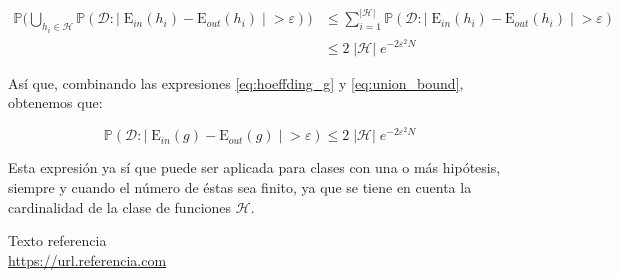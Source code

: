 \documentclass[11pt,a4paper]{article}
\begin{document}
\begin{equation}
\label{eq:union_bound}
\begin{split}
	\mathbb{P} \Bigg( \bigcup_{h_i \in \mathcal{H}}
	\mathbb{P}(\mathcal{D}: | \; \text{E}_{in}(h_i) - \text{E}_{out}(h_i) \; | \; > \varepsilon) \Bigg) &\leq
	\sum_{i = 1}^{|\mathcal{H}|} \mathbb{P}(\mathcal{D}: | \;\text{E}_{in}(h_i) - \text{E}_{out}(h_i) \; | \; > \varepsilon) \\
	&\leq 2 \; |\mathcal{H}|  \; e^{-2\varepsilon^2N}
\end{split}
\end{equation}

Así que, combinando las expresiones \eqref{eq:hoeffding_g} y \eqref{eq:union_bound}, obtenemos que:

\begin{equation}
	\mathbb{P}(\mathcal{D}: | \; \text{E}_{in}(g) - \text{E}_{out}(g) \; | \; > \varepsilon)  \leq
	2 \; |\mathcal{H}|  \; e^{-2\varepsilon^2N}
\end{equation}


Esta expresión ya sí que puede ser aplicada para clases con una o más hipótesis, siempre y cuando el número de éstas
sea finito, ya que se tiene en cuenta la cardinalidad de la clase de funciones $\mathcal{H}$.





\newpage

\begin{thebibliography}{5}

Texto referencia
\\\url{https://url.referencia.com}

\end{thebibliography}
\end{document}
